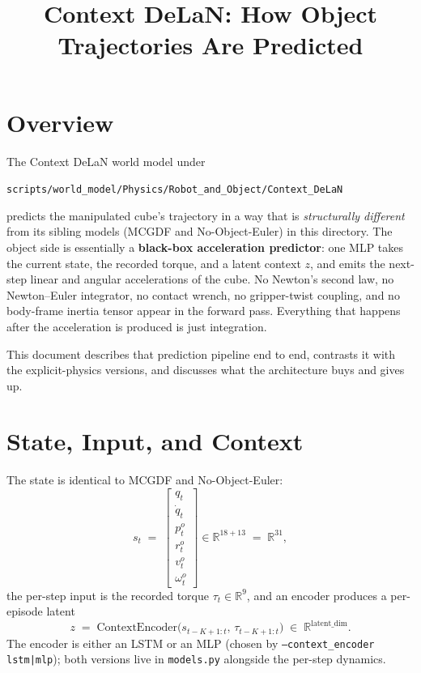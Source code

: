 \documentclass[11pt]{article}
\title{Context DeLaN: How Object Trajectories Are Predicted}
\author{}
\date{}
\begin{document}
\maketitle

\section{Overview}

The Context DeLaN world model under
\begin{center}
\texttt{scripts/world\_model/Physics/Robot\_and\_Object/Context\_DeLaN}
\end{center}
predicts the manipulated cube's trajectory in a way that is
\emph{structurally different} from its sibling models (MCGDF and
No-Object-Euler) in this directory.  The object side is essentially a
\textbf{black-box acceleration predictor}: one MLP takes the current
state, the recorded torque, and a latent context $z$, and emits the
next-step linear and angular accelerations of the cube.  No Newton's
second law, no Newton--Euler integrator, no contact wrench, no
gripper-twist coupling, and no body-frame inertia tensor appear in the
forward pass.  Everything that happens after the acceleration is
produced is just integration.

This document describes that prediction pipeline end to end, contrasts
it with the explicit-physics versions, and discusses what the
architecture buys and gives up.

\section{State, Input, and Context}

The state is identical to MCGDF and No-Object-Euler:
\begin{equation}
  s_t \;=\;
  \begin{bmatrix}
    q_t \\ \dot q_t \\ p^o_t \\ r^o_t \\ v^o_t \\ \omega^o_t
  \end{bmatrix}
  \in \mathbb{R}^{18 + 13} \;=\; \mathbb{R}^{31},
\end{equation}
the per-step input is the recorded torque
$\tau_t \in \mathbb{R}^{9}$, and an encoder produces a per-episode
latent
\begin{equation}
  z \;=\; \mathrm{ContextEncoder}\bigl(s_{t-K+1:t},\,\tau_{t-K+1:t}\bigr)
  \;\in\; \mathbb{R}^{\mathrm{latent\_dim}}.
  \label{eq:cd-z}
\end{equation}
The encoder is either an LSTM or an MLP (chosen by
\texttt{--context\_encoder lstm|mlp}); both versions live in
\texttt{models.py} alongside the per-step dynamics.
\end{document}
